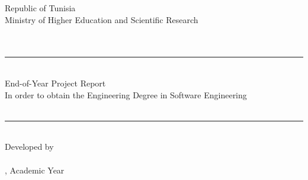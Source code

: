 \begin{titlepage}
\begin{center}
{\large Republic of Tunisia}\\
{\large Ministry of Higher Education and Scientific Research}\\[6mm]
{\Large \textbf{\UNIVERSITY}}\\
{\large \UPMCentre}\\[12mm]
\rule{\linewidth}{1.2pt}\\[12mm]

{\Large End-of-Year Project Report}\\[5mm]
{\large In order to obtain the Engineering Degree in Software Engineering}\\[18mm]

{\Huge \textbf{\thesisTitle}}\\[14mm]
\rule{\linewidth}{1.2pt}\\[18mm]

{\large Developed by}\\[3mm]
{\LARGE \textbf{\thesisAuthor}}\\[12mm]

\vfill
{\large \thesisPlace, Academic Year \thesisDate}
\end{center}
\end{titlepage}
